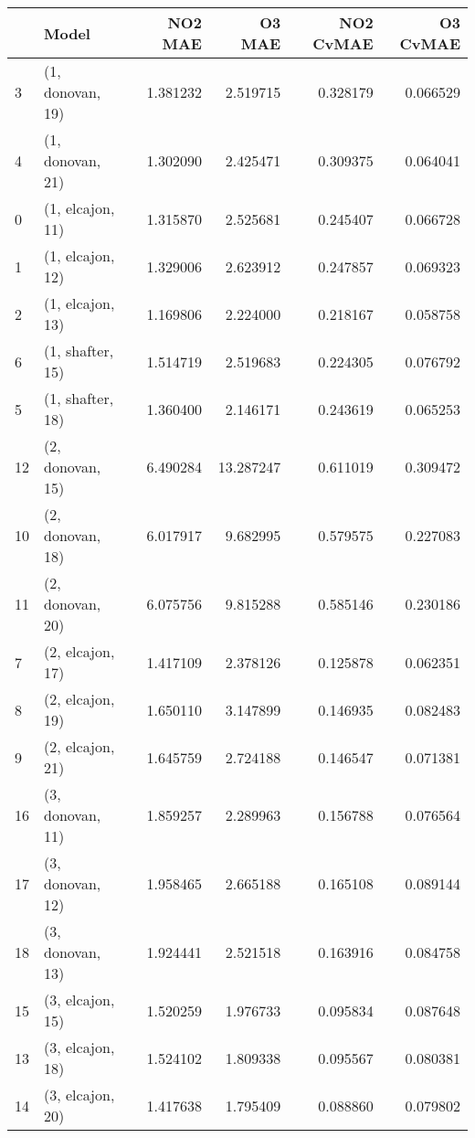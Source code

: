 \begin{tabular}{llrrrr}
\toprule
{} &             Model &   NO2 MAE &     O3 MAE &  NO2 CvMAE &  O3 CvMAE \\
\midrule
3  &  (1, donovan, 19) &  1.381232 &   2.519715 &   0.328179 &  0.066529 \\
4  &  (1, donovan, 21) &  1.302090 &   2.425471 &   0.309375 &  0.064041 \\
0  &  (1, elcajon, 11) &  1.315870 &   2.525681 &   0.245407 &  0.066728 \\
1  &  (1, elcajon, 12) &  1.329006 &   2.623912 &   0.247857 &  0.069323 \\
2  &  (1, elcajon, 13) &  1.169806 &   2.224000 &   0.218167 &  0.058758 \\
6  &  (1, shafter, 15) &  1.514719 &   2.519683 &   0.224305 &  0.076792 \\
5  &  (1, shafter, 18) &  1.360400 &   2.146171 &   0.243619 &  0.065253 \\
12 &  (2, donovan, 15) &  6.490284 &  13.287247 &   0.611019 &  0.309472 \\
10 &  (2, donovan, 18) &  6.017917 &   9.682995 &   0.579575 &  0.227083 \\
11 &  (2, donovan, 20) &  6.075756 &   9.815288 &   0.585146 &  0.230186 \\
7  &  (2, elcajon, 17) &  1.417109 &   2.378126 &   0.125878 &  0.062351 \\
8  &  (2, elcajon, 19) &  1.650110 &   3.147899 &   0.146935 &  0.082483 \\
9  &  (2, elcajon, 21) &  1.645759 &   2.724188 &   0.146547 &  0.071381 \\
16 &  (3, donovan, 11) &  1.859257 &   2.289963 &   0.156788 &  0.076564 \\
17 &  (3, donovan, 12) &  1.958465 &   2.665188 &   0.165108 &  0.089144 \\
18 &  (3, donovan, 13) &  1.924441 &   2.521518 &   0.163916 &  0.084758 \\
15 &  (3, elcajon, 15) &  1.520259 &   1.976733 &   0.095834 &  0.087648 \\
13 &  (3, elcajon, 18) &  1.524102 &   1.809338 &   0.095567 &  0.080381 \\
14 &  (3, elcajon, 20) &  1.417638 &   1.795409 &   0.088860 &  0.079802 \\
\bottomrule
\end{tabular}
